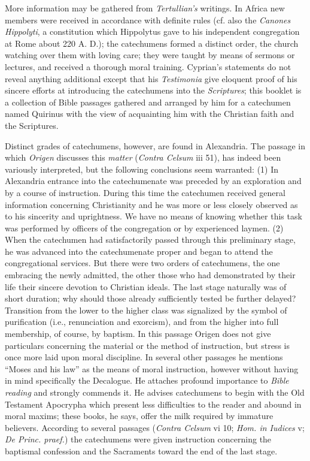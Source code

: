 More information may be gathered from \emph{Tertullian’s} writings. In Africa new members were received in accordance with definite rules (cf. also the \emph{Canones Hippolyti}, a constitution which Hippolytus gave to his independent congregation at Rome about 220 A. D.); the catechumens formed a distinct order, the church watching over them with loving care; they were taught by means of sermons or lectures, and received a thorough moral training. Cyprian’s statements do not reveal anything additional except that his \emph{Testimonia} give eloquent proof of his sincere efforts at introducing the catechumens into the \emph{Scriptures}; this booklet is a collection of Bible passages gathered and arranged by him for a catechumen named Quirinus with the view of acquainting him with the Christian faith and the Scriptures.

Distinct grades of catechumens, however, are found in Alexandria. The passage in which \emph{Origen} discusses this \emph{matter} (\emph{Contra Celsum} iii 51), has indeed been variously interpreted, but the following conclusions seem warranted: (1) In Alexandria entrance into the catechumenate was preceded by an exploration and by a course of instruction. During this time the catechumen received general information concerning
Christianity and he was more or less closely observed as to his sincerity and uprightness. We have no means of knowing whether this task was performed by officers of the congregation or by experienced laymen. (2) When the catechumen had satisfactorily passed through this preliminary stage, he was advanced into the catechumenate proper and began to attend the congregational services. But there were two orders of catechumens, the one embracing the newly admitted, the other those who had demonstrated by their life their sincere devotion to Christian ideals. The last stage naturally was of short duration; why should those already sufficiently tested be further delayed? Transition from the lower to the higher class was signalized by the symbol of purification (i.e., renunciation and exorcism), and from the higher into full membership, of course, by baptism. In this passage Origen does not give particulars concerning the material or the method of instruction, but stress is once more laid upon moral discipline. In several other passages he mentions “Moses and his law” as the means of moral instruction, however without having in mind specifically the Decalogue. He attaches profound importance to \emph{Bible reading} and strongly commends it. He advises catechumens to begin with the Old Testament Apocrypha which present less difficulties to the reader and abound in moral maxims; these books, he says, offer the milk required by immature believers. According to several passages (\emph{Contra Celsum} vi 10; \emph{Hom. in Iudices} v; \emph{De Princ. praef.}) the catechumens were given instruction concerning the baptismal confession and the Sacraments toward the end of the last stage.

